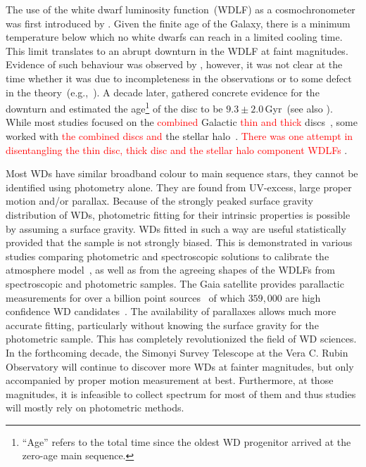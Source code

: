 \documentclass[fleqn,usenatbib]{rasti}
\begin{document}
The use of the white dwarf luminosity function~(WDLF) as a cosmochronometer was
first introduced by \citet{1959ApJ...129..243S}. Given the finite age of the
Galaxy, there is a minimum temperature below which no white dwarfs can reach in
a limited cooling time. This limit translates to an abrupt downturn in the WDLF
at faint magnitudes. Evidence of such behaviour was observed by
\citet{1979ApJ...233..226L}, however, it was not clear at the time whether it
was due to incompleteness in the observations or to some defect in the
theory~(e.g.,~\citealp{1984ApJ...282..615I}). A decade later,
\citet{1987ApJ...315L..77W} gathered concrete evidence for the downturn and
estimated the age\footnote{``Age'' refers to the total time since the oldest
WD progenitor arrived at the zero-age main sequence.} of the disc to be
$9.3 \pm 2.0$\,Gyr~(see also \citealt{1988ApJ...332..891L}). While most studies
focused on the \textcolor{red}{combined} Galactic \textcolor{red}{thin and thick} discs~\citep{1989LNP...328...15L, 1992ApJ...386..539W,
1995LNP...443...24O, 1998ApJ...497..294L, 1999MNRAS.306..736K,
2012ApJS..199...29G, 2021A&A...649A...6G}, some worked with \textcolor{red}{the combined discs and} the stellar
halo~\citep{2006AJ....131..571H, 2017AJ....153...10M, 2019MNRAS.482..715L}.
\textcolor{red}{There was one attempt in disentangling the thin disc, thick disc
and the stellar halo component WDLFs \citep{2011MNRAS.417...93R}}.
 
Most WDs have similar broadband colour to main sequence stars, they cannot be
identified using photometry alone. They are found from UV-excess, large
proper motion and/or parallax. Because of the strongly peaked surface gravity
distribution of WDs, photometric fitting for their intrinsic properties
is possible by assuming a surface gravity. WDs fitted in such a way are useful
statistically provided that the sample is not strongly biased. This is
demonstrated in various studies comparing photometric and spectroscopic
solutions to calibrate the atmosphere
model~\citep{2019ApJ...871..169G, 2019ApJ...882..106G}, as well as from the
agreeing shapes of the WDLFs from spectroscopic and photometric samples. The
Gaia satellite provides parallactic measurements for over a billion point
sources~\citep{2021A&A...649A...1G, 2021AJ....161..147B} of which $359,000$
are high confidence WD candidates~\citep[][hereafter, GF21]{2021MNRAS.508.3877G}.
The availability of parallaxes allows much more accurate fitting, particularly
without knowing the surface gravity for the photometric sample. This has
completely  revolutionized the field of WD sciences. In the forthcoming decade,
the Simonyi Survey Telescope at the Vera C. Rubin Observatory will continue to
discover more WDs at fainter magnitudes, but only accompanied by proper
motion measurement at best. Furthermore, at those magnitudes, it is infeasible
to collect spectrum for most of them and thus studies will mostly rely on
photometric methods.
\end{document}
